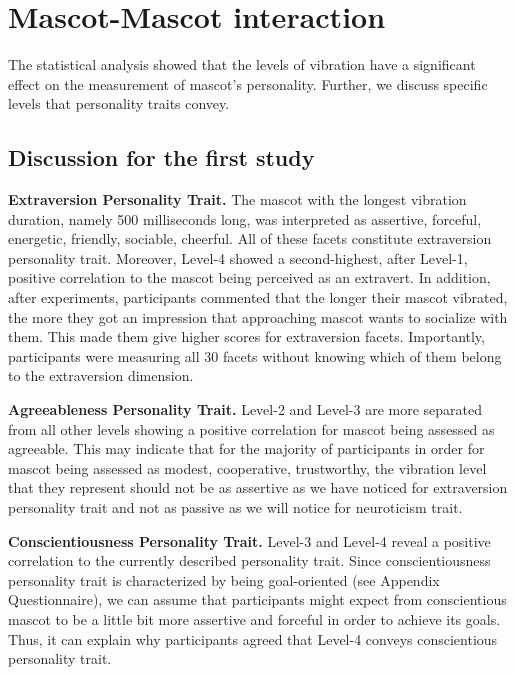 \section{Mascot-Mascot interaction}
\label{sec:mascot-mascot-interaction}
The statistical analysis showed that the levels of vibration have a significant effect on the
measurement of mascot's personality.
Further, we discuss specific levels that personality traits convey.

\subsection{Discussion for the first study}
\label{subsec:discussion-for-the-first-study2}

\par\textbf{Extraversion Personality Trait.}
The mascot with the longest vibration duration, namely 500 milliseconds long, was interpreted as assertive,
forceful, energetic, friendly, sociable, cheerful.
All of these facets constitute extraversion personality trait.
Moreover, Level-4 showed a second-highest, after Level-1, positive correlation to the mascot
being perceived as an extravert.
In addition, after experiments, participants commented that the longer their mascot vibrated,
the more they got an impression that approaching mascot wants to socialize with them.
This made them give higher scores for extraversion facets.
Importantly, participants were measuring all 30 facets without knowing which of them
belong to the extraversion dimension.

\par\textbf{Agreeableness Personality Trait.}
Level-2 and Level-3 are more separated from all other levels showing a positive correlation
for mascot being assessed as agreeable.
This may indicate that for the majority of participants in order for mascot being assessed as modest,
cooperative, trustworthy, the vibration level that they represent should not be as assertive as we have
noticed for extraversion personality trait and not as passive as we will notice for neuroticism trait.

\par\textbf{Conscientiousness Personality Trait.}
Level-3 and Level-4 reveal a positive correlation to the currently described personality trait.
Since conscientiousness personality trait is characterized by being goal-oriented (see Appendix Questionnaire),
we can assume that participants might expect from conscientious mascot to be a little bit more assertive and
forceful in order to achieve its goals.
Thus, it can explain why participants agreed that Level-4 conveys conscientious personality trait.


